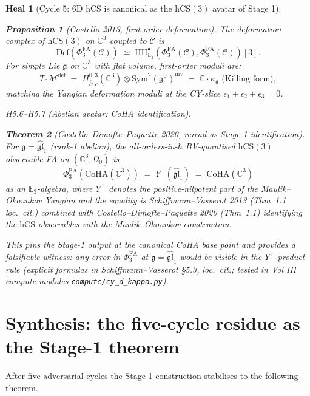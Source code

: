 \documentclass[11pt]{article}
\newtheorem{theorem}{Theorem}
\newtheorem{proposition}[theorem]{Proposition}
\newtheorem*{heal}{Heal}
\theoremstyle{definition}
\providecommand{\CC}{\mathbb{C}}
\providecommand{\HH}{\mathrm{HH}}
\providecommand{\fg}{\mathfrak{g}}
\providecommand{\hbarb}{\hbar}
\providecommand{\cC}{\mathcal{C}}
\providecommand{\cM}{\mathcal{M}}
\providecommand{\Sym}{\mathrm{Sym}}
\providecommand{\hCS}{\mathrm{hCS}}
\providecommand{\FA}{\mathrm{FA}}
\providecommand{\CoHA}{\mathrm{CoHA}}
\begin{document}
\begin{heal}[Cycle 5: 6D hCS is canonical as the $\hCS(3)$ avatar of Stage 1]
\begin{proposition}[Costello 2013, first-order deformation]
\label{prop:costello-deformations}
The deformation complex of $\hCS(3)$ on $\CC^3$ coupled to $\cC$ is
\[
  \mathrm{Def}(\Phi^{\FA}_3(\cC))
  \;\simeq\;
  \HH^\bullet_{\mathbb{E}_3}(\Phi^{\FA}_3(\cC), \Phi^{\FA}_3(\cC))[3].
\]
For simple Lie $\fg$ on $\CC^3$ with flat volume, first-order
moduli are:
\[
  T_0\cM^{\mathrm{def}} \;=\; H^{0,3}_{\bar\partial,c}(\CC^3)\otimes
  \Sym^2(\fg^\vee)^{\mathrm{inv}}
  \;=\; \CC\cdot\kappa_\fg \text{ (Killing form)},
\]
matching the Yangian deformation moduli at the CY-slice
$\epsilon_1 + \epsilon_2 + \epsilon_3 = 0$.
\end{proposition}

\emph{H5.6--H5.7 (Abelian avatar: CoHA identification).}

\begin{theorem}[Costello--Dimofte--Paquette 2020, reread as Stage-1
identification]
\label{thm:cdp-cohA}
For $\fg = \widehat{\mathfrak{gl}}_1$ (rank-1 abelian), the
all-orders-in-$\hbarb$ BV-quantised $\hCS(3)$ observable FA on
$(\CC^3, \Omega_0)$ is
\[
  \Phi^{\FA}_3(\CoHA(\CC^3))
  \;=\; Y^+(\widehat{\mathfrak{gl}}_1) \;=\; \CoHA(\CC^3)
\]
as an $\mathbb{E}_3$-algebra, where $Y^+$ denotes the positive-nilpotent
part of the Maulik--Okounkov Yangian and the equality is
Schiffmann--Vasserot 2013 (Thm~1.1 loc.~cit.) combined with
Costello--Dimofte--Paquette 2020 (Thm~1.1) identifying the $\hCS$
observables with the Maulik--Okounkov construction.

This pins the Stage-1 output at the canonical CoHA base point and
provides a falsifiable witness: any error in $\Phi^{\FA}_3$ at
$\fg = \widehat{\mathfrak{gl}}_1$ would be visible in the
$Y^+$-product rule (explicit formulas in Schiffmann--Vasserot
\S5.3, loc.~cit.; tested in Vol III compute modules
\texttt{compute/cy\_d\_kappa.py}).
\end{theorem}
\end{heal}

\section*{Synthesis: the five-cycle residue as the Stage-1 theorem}

After five adversarial cycles the Stage-1 construction stabilises to
the following theorem.
\end{document}
